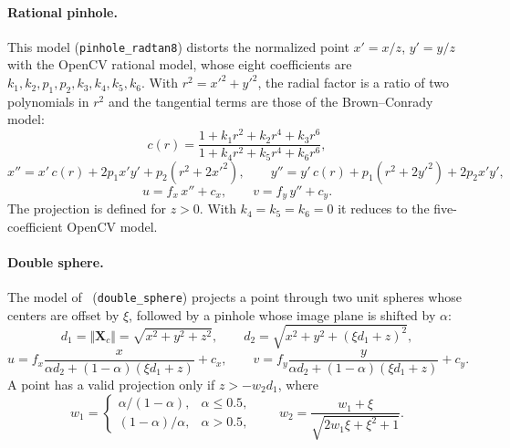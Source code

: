 \documentclass{article}
\let\oldparagraph\paragraph
\renewcommand{\paragraph}[1]{\oldparagraph{#1}\mbox{}}
\begin{document}
\paragraph{Rational pinhole.} This model (\texttt{pinhole\_radtan8}) distorts the normalized point $x' = x/z$, $y' = y/z$ with the OpenCV rational model, whose eight coefficients are $k_1, k_2, p_1, p_2, k_3, k_4, k_5, k_6$. With $r^2 = x'^2 + y'^2$, the radial factor is a ratio of two polynomials in $r^2$ and the tangential terms are those of the Brown--Conrady model:
\begin{equation}
c(r) = \frac{1 + k_1 r^2 + k_2 r^4 + k_3 r^6}{1 + k_4 r^2 + k_5 r^4 + k_6 r^6},
\end{equation}
\begin{equation}
x'' = x' \, c(r) + 2 p_1 x' y' + p_2 \left(r^2 + 2 x'^2\right), \qquad
y'' = y' \, c(r) + p_1 \left(r^2 + 2 y'^2\right) + 2 p_2 x' y',
\end{equation}
\begin{equation}
u = f_x \, x'' + c_x, \qquad v = f_y \, y'' + c_y .
\end{equation}
The projection is defined for $z > 0$. With $k_4 = k_5 = k_6 = 0$ it reduces to the five-coefficient OpenCV model.

\paragraph{Double sphere.} The model of~\cite{usenko2018double} (\texttt{double\_sphere}) projects a point through two unit spheres whose centers are offset by $\xi$, followed by a pinhole whose image plane is shifted by $\alpha$:
\begin{equation}
d_1 = \Vert \mathbf{X}_c \Vert = \sqrt{x^2 + y^2 + z^2}, \qquad
d_2 = \sqrt{x^2 + y^2 + (\xi d_1 + z)^2},
\end{equation}
\begin{equation}
u = f_x \frac{x}{\alpha d_2 + (1 - \alpha)(\xi d_1 + z)} + c_x, \qquad
v = f_y \frac{y}{\alpha d_2 + (1 - \alpha)(\xi d_1 + z)} + c_y .
\end{equation}
A point has a valid projection only if $z > -w_2 d_1$, where
\begin{equation}
w_1 = \begin{cases} \alpha / (1 - \alpha), & \alpha \le 0.5, \\ (1 - \alpha) / \alpha, & \alpha > 0.5, \end{cases} \qquad
w_2 = \frac{w_1 + \xi}{\sqrt{2 w_1 \xi + \xi^2 + 1}} .
\end{equation}
\end{document}
